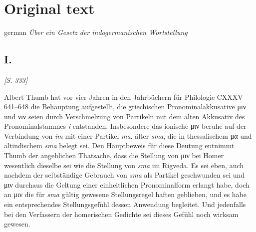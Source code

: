 \chapter{Original text}\label{original}
\begin{otherlanguage*}{german}
\emph{\Large{Über ein Gesetz der indogermanischen Wortstellung}}

\section*{I.}

\hypertarget{p333}{\emph{[S. 333]}}\label{p333} Albert Thumb hat vor vier Jahren in den Jahrbüchern für Philologie CXXXV 641--648 die Behauptung aufgestellt, die griechischen Pronominalakkusative μιν und νιν seien durch Verschmelzung von Partikeln mit dem alten Akkusativ des Pronominalstammes \emph{i} entstanden. Insbesondere das ionische μιν beruhe auf der Verbindung von \emph{im} mit einer Partikel \emph{ma}, älter \textit{sma}, die in thessalischem μα und altindischem \textit{sma} belegt sei. Den Hauptbeweis für diese Deutung entnimmt Thumb der angeblichen Thatsache, dass die Stellung von μιν bei Homer wesentlich dieselbe sei wie die Stellung von \emph{sma} im Rigveda. Es sei eben, auch nachdem der selbständige Gebrauch von \emph{sma} als Partikel geschwunden sei und μιν durchaus die Geltung einer einheitlichen Pronominalform erlangt habe, doch an μιν die für \emph{sma} gültig gewesene Stellungsregel haften geblieben, und es habe ein entsprechendes Stellungsgefühl dessen Anwendung begleitet. Und jedenfalls bei den Verfassern der homerischen Gedichte sei dieses Gefühl noch wirksam gewesen.


\end{otherlanguage*}
